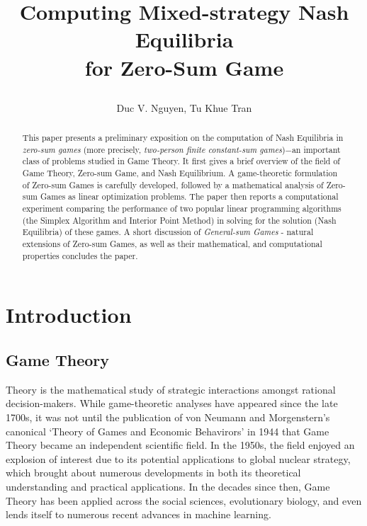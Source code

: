 \documentclass[journal, 11pt, a4paper, twoside]{IEEEtran}
\begin{document}
\title{\date{} Computing Mixed-strategy Nash Equilibria \\ for Zero-Sum Game}

\author{Duc V. Nguyen, Tu Khue Tran}
\maketitle
\begin{abstract}
    This paper presents a preliminary exposition on the computation of Nash Equilibria in \textit{zero-sum games} (more precisely, \textit{two-person finite constant-sum games})\(-\)an important class of problems studied in Game Theory. It first gives a brief overview of the field of Game Theory, Zero-sum Game, and Nash Equilibrium. A game-theoretic formulation of Zero-sum Games is carefully developed, followed by a mathematical analysis of Zero-sum Games as linear optimization problems. The paper then reports a computational experiment comparing the performance of two popular linear programming algorithms (the Simplex Algorithm and Interior Point Method) in solving for the solution (Nash Equilibria) of these games. A short discussion of \textit{General-sum Games} - natural extensions of Zero-sum Games, as well as their mathematical, and computational properties concludes the paper.
\end{abstract}
\section{Introduction}
\subsection{Game Theory}
 Theory is the mathematical study of strategic interactions amongst rational decision-makers. While game-theoretic analyses have appeared since the late 1700s, it was not until the publication of von Neumann and Morgenstern’s canonical ‘Theory of Games and Economic Behavirors’ in 1944 that Game Theory became an independent scientific field. In the 1950s, the field enjoyed an explosion of interest due to its potential applications to global nuclear strategy, which brought about numerous developments in both its theoretical understanding and practical applications. In the decades since then, Game Theory has been applied across the social sciences, evolutionary biology, and even lends itself to numerous recent advances in machine learning. 
\end{document}
